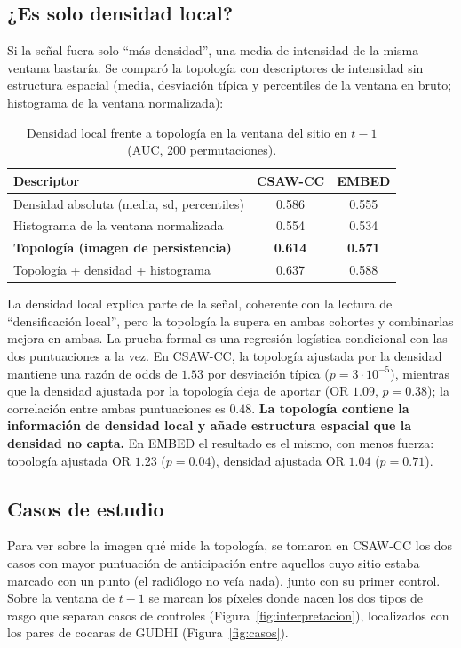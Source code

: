 \subsection{¿Es solo densidad local?}
Si la señal fuera solo ``más densidad'', una media de intensidad de la
misma ventana bastaría. Se comparó la topología con descriptores de
intensidad sin estructura espacial (media, desviación típica y percentiles
de la ventana en bruto; histograma de la ventana normalizada):

\begin{table}[H]
\centering
\caption{Densidad local frente a topología en la ventana del sitio en
$t-1$ (AUC, 200 permutaciones).}
\label{tab:densidad}
\begin{tabular}{@{}lcc@{}}
\toprule
\textbf{Descriptor} & \textbf{CSAW-CC} & \textbf{EMBED} \\
\midrule
Densidad absoluta (media, sd, percentiles) & 0.586 & 0.555 \\
Histograma de la ventana normalizada       & 0.554 & 0.534 \\
\textbf{Topología (imagen de persistencia)} & \textbf{0.614} & \textbf{0.571} \\
Topología + densidad + histograma          & 0.637 & 0.588 \\
\bottomrule
\end{tabular}
\end{table}

La densidad local explica parte de la señal, coherente con la lectura de
``densificación local'', pero la topología la supera en ambas cohortes y
combinarlas mejora en ambas. La prueba formal es una regresión logística
condicional con las dos puntuaciones a la vez. En CSAW-CC, la topología
ajustada por la densidad mantiene una razón de odds de $1.53$ por desviación
típica ($p = 3\cdot10^{-5}$), mientras que la densidad ajustada por la
topología deja de aportar (OR $1.09$, $p = 0.38$); la correlación entre
ambas puntuaciones es $0.48$. \textbf{La topología contiene la información
de densidad local y añade estructura espacial que la densidad no capta.}
En EMBED el resultado es el mismo, con menos fuerza: topología ajustada OR
$1.23$ ($p = 0.04$), densidad ajustada OR $1.04$ ($p = 0.71$).

\subsection{Casos de estudio}
Para ver sobre la imagen qué mide la topología, se tomaron en CSAW-CC los dos
casos con mayor puntuación de anticipación entre aquellos cuyo sitio estaba
marcado con un punto (el radiólogo no veía nada), junto con su primer
control. Sobre la ventana de $t-1$ se marcan los píxeles donde nacen los dos
tipos de rasgo que separan casos de controles
(Figura~\ref{fig:interpretacion}), localizados con los pares de cocaras de
GUDHI (Figura~\ref{fig:casos}).


